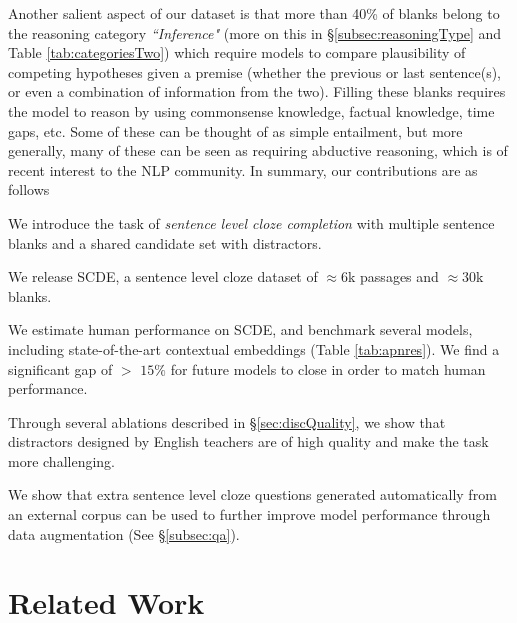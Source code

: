 \documentclass[11pt,a4paper]{article}
\newenvironment{tight_enumerate}{
\begin{enumerate}
  \setlength{\itemsep}{0pt}
  \setlength{\parskip}{0pt}
}{\end{enumerate}}
\newcommand{\dsname}{\textsc{SCDE}}
\begin{document}
Another salient aspect of our dataset is that more than 40\% of blanks belong to the reasoning category \emph{``Inference"} (more on this in \S \ref{subsec:reasoningType} and Table \ref{tab:categoriesTwo}) which require models to compare  plausibility of competing hypotheses given a premise (whether the previous or last sentence(s), or even a combination of information from the two). Filling these blanks requires the model to reason by using commonsense knowledge, factual knowledge, time gaps, etc. Some of these can be thought of as simple entailment, but more generally, many of these can be seen as requiring abductive reasoning, which is of recent interest \cite{bhagavatula2019abductive,sap2019atomic,sap2019socialiqa} to the NLP community. In summary, our contributions are as follows
\vspace{-\topsep}
\begin{tight_enumerate}
  \setlength{\parskip}{0pt}
  \setlength{\itemsep}{0pt plus 1pt}
   \item We introduce the task of \emph{sentence level cloze completion} with multiple sentence blanks and a shared candidate set with distractors. 
    \item We release \dsname, a sentence level cloze dataset of $\approx6$k passages and $\approx30$k blanks.
    \item We estimate human performance on \dsname, and benchmark several models, including state-of-the-art contextual embeddings (Table \ref{tab:apnres}). We find a significant gap of $>$ $15\%$ for future models to close in order to match human performance.
    \item  Through several ablations described in \S\ref{sec:discQuality}, we show that distractors designed by English teachers are of high quality and make the task more challenging. 
    \item We show that extra sentence level cloze questions generated automatically from an external corpus can be used to further improve model performance through data augmentation (See \S \ref{subsec:qa}).
\end{tight_enumerate} \section{Related Work}
\label{sec:related}
\end{document}
